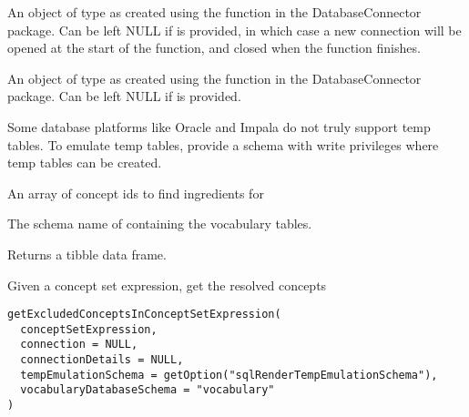 \documentclass[a4paper]{book}
\begin{document}
%
\begin{Arguments}
\begin{ldescription}
\item[\code{connection}] An object of type  as created using the
 function in the
DatabaseConnector package. Can be left NULL if 
is provided, in which case a new connection will be opened at the start
of the function, and closed when the function finishes.

\item[\code{connectionDetails}] An object of type  as created using the
 function in the
DatabaseConnector package. Can be left NULL if  is
provided.

\item[\code{tempEmulationSchema}] Some database platforms like Oracle and Impala do not truly support temp tables. To emulate temp 
tables, provide a schema with write privileges where temp tables can be created.

\item[\code{conceptIds}] An array of concept ids to find ingredients for

\item[\code{vocabularyDatabaseSchema}] The schema name of containing the vocabulary tables.
\end{ldescription}
\end{Arguments}
%
\begin{Value}
Returns a tibble data frame.
\end{Value}
%
\begin{Description}\relax
Given a concept set expression, get the resolved concepts
\end{Description}
%
\begin{Usage}
\begin{verbatim}
getExcludedConceptsInConceptSetExpression(
  conceptSetExpression,
  connection = NULL,
  connectionDetails = NULL,
  tempEmulationSchema = getOption("sqlRenderTempEmulationSchema"),
  vocabularyDatabaseSchema = "vocabulary"
)
\end{verbatim}
\end{Usage}
%
\end{document}
